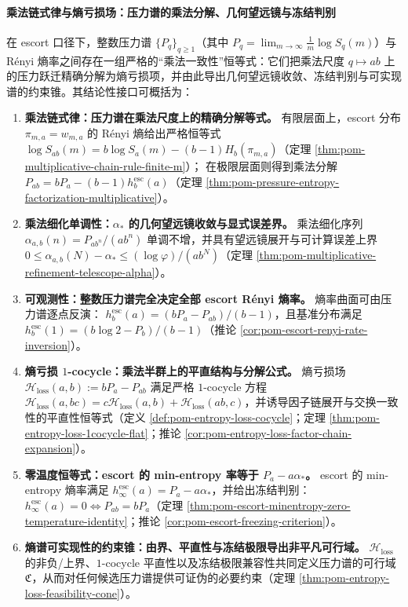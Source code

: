 \paragraph{乘法链式律与熵亏损场：压力谱的乘法分解、几何望远镜与冻结判别}
在 escort 口径下，整数压力谱 \(\{P_q\}_{q\ge 1}\)（其中 \(P_q=\lim_{m\to\infty}\frac{1}{m}\log S_q(m)\)）与 R\'enyi 熵率之间存在一组严格的“乘法一致性”恒等式：它们把乘法尺度 \(q\mapsto ab\) 上的压力跃迁精确分解为熵亏损项，并由此导出几何望远镜收敛、冻结判别与可实现谱的约束锥。其结论性接口可概括为：
\begin{enumerate}
  \item \textbf{乘法链式律：压力谱在乘法尺度上的精确分解等式。}
  有限层面上，escort 分布 \(\pi_{m,a}=w_{m,a}\) 的 R\'enyi 熵给出严格恒等式
  \(\log S_{ab}(m)=b\log S_a(m)-(b-1)H_b(\pi_{m,a})\)（定理 \ref{thm:pom-multiplicative-chain-rule-finite-m}）；
  在极限层面则得到乘法分解
  \(P_{ab}=bP_a-(b-1)h^{\mathrm{esc}}_b(a)\)（定理 \ref{thm:pom-pressure-entropy-factorization-multiplicative}）。

  \item \textbf{乘法细化单调性：\texorpdfstring{$\alpha_\ast$}{alpha*} 的几何望远镜收敛与显式误差界。}
  乘法细化序列 \(\alpha_{a,b}(n)=P_{ab^n}/(ab^n)\) 单调不增，并具有望远镜展开与可计算误差上界
  \(0\le \alpha_{a,b}(N)-\alpha_\ast\le (\log\varphi)/(ab^N)\)（定理 \ref{thm:pom-multiplicative-refinement-telescope-alpha}）。

  \item \textbf{可观测性：整数压力谱完全决定全部 escort R\'enyi 熵率。}
  熵率曲面可由压力谱逐点反演：
  \(h^{\mathrm{esc}}_b(a)=(bP_a-P_{ab})/(b-1)\)，且基准分布满足 \(h^{\mathrm{esc}}_b(1)=(b\log 2-P_b)/(b-1)\)（推论 \ref{cor:pom-escort-renyi-rate-inversion}）。

  \item \textbf{熵亏损 \(1\)-cocycle：乘法半群上的平直结构与分解公式。}
  熵亏损场 \(\mathcal{H}_{\mathrm{loss}}(a,b):=bP_a-P_{ab}\) 满足严格 \(1\)-cocycle 方程
  \(\mathcal{H}_{\mathrm{loss}}(a,bc)=c\mathcal{H}_{\mathrm{loss}}(a,b)+\mathcal{H}_{\mathrm{loss}}(ab,c)\)，并诱导因子链展开与交换一致性的平直性恒等式（定义 \ref{def:pom-entropy-loss-cocycle}；定理 \ref{thm:pom-entropy-loss-1cocycle-flat}；推论 \ref{cor:pom-entropy-loss-factor-chain-expansion}）。

  \item \textbf{零温度恒等式：escort 的 min-entropy 率等于 \texorpdfstring{$P_a-a\alpha_\ast$}{Pa-a alpha*}。}
  escort 的 min-entropy 熵率满足 \(h_\infty^{\mathrm{esc}}(a)=P_a-a\alpha_\ast\)，并给出冻结判别：\(h_\infty^{\mathrm{esc}}(a)=0\Longleftrightarrow P_{ab}=bP_a\)（定理 \ref{thm:pom-escort-minentropy-zero-temperature-identity}；推论 \ref{cor:pom-escort-freezing-criterion}）。

  \item \textbf{熵谱可实现性的约束锥：由界、平直性与冻结极限导出非平凡可行域。}
  \(\mathcal{H}_{\mathrm{loss}}\) 的非负/上界、\(1\)-cocycle 平直性以及冻结极限兼容性共同定义压力谱的可行域 \(\mathfrak{C}\)，从而对任何候选压力谱提供可证伪的必要约束（定理 \ref{thm:pom-entropy-loss-feasibility-cone}）。
\end{enumerate}

